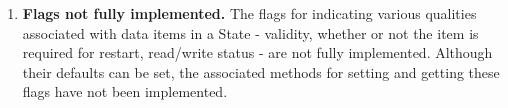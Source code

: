 %


\begin{enumerate}
\item{\bf Flags not fully implemented.}
The flags for indicating various qualities associated with 
data items in a State - validity, whether or not the item is
required for restart, read/write status - are not fully implemented.
Although their defaults can be set, the associated methods for 
setting and getting these flags have not been implemented.

\end{enumerate}



